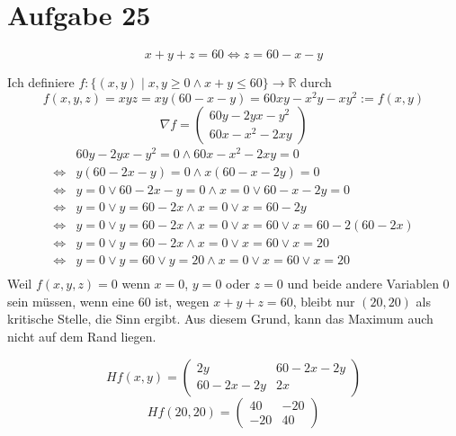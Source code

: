 \documentclass[10pt,a4paper]{article}
\begin{document}
\section*{Aufgabe 25}

\begin{equation}
x + y + z = 60 \Leftrightarrow z = 60 - x - y
\end{equation}

Ich definiere $f: \{ (x, y) \mid x, y \ge 0 \land x + y \le 60 \} \rightarrow \mathbb{R}$ durch
\begin{equation}
f(x, y, z) = xyz = xy(60 - x - y) = 60xy - x^{2}y - xy^{2} := f(x, y)
\end{equation}
\begin{equation}
\nabla f = \begin{pmatrix}
60y - 2yx - y^{2}\\
60x - x^{2} - 2xy
\end{pmatrix}
\end{equation}
\begin{align*}
& 60y - 2yx - y^{2} = 0 \land 60x - x^{2} - 2xy = 0\\
\Leftrightarrow & y(60 - 2x - y) = 0 \land x(60 - x - 2y) = 0\\
\Leftrightarrow & y = 0 \lor 60 - 2x - y = 0 \land x = 0 \lor 60 - x - 2y = 0\\
\Leftrightarrow & y = 0 \lor y = 60 - 2x \land x = 0 \lor x = 60 - 2y\\
\Leftrightarrow & y = 0 \lor y = 60 - 2x \land x = 0 \lor x = 60 \lor x = 60 - 2(60 - 2x)\\
\Leftrightarrow & y = 0 \lor y = 60 - 2x \land x = 0 \lor x = 60 \lor x = 20\\
\Leftrightarrow & y = 0 \lor y = 60 \lor y = 20 \land x = 0 \lor x = 60 \lor x = 20\\
\end{align*}
Weil $f(x, y, z) = 0$ wenn $x = 0$, $y = 0$ oder $z = 0$ und beide andere Variablen $0$ sein müssen, wenn eine $60$ ist, wegen $x + y + z = 60$, bleibt nur $(20, 20)$ als kritische Stelle, die Sinn ergibt.
Aus diesem Grund, kann das Maximum auch nicht auf dem Rand liegen.

\begin{equation}
Hf(x, y) = \begin{pmatrix}
2y & 60 - 2x - 2y\\
60 - 2x - 2y & 2x
\end{pmatrix}
\end{equation}
\begin{equation}
Hf(20, 20) = \begin{pmatrix}
40 & -20\\
-20 & 40
\end{pmatrix}
\end{equation}
\end{document}
